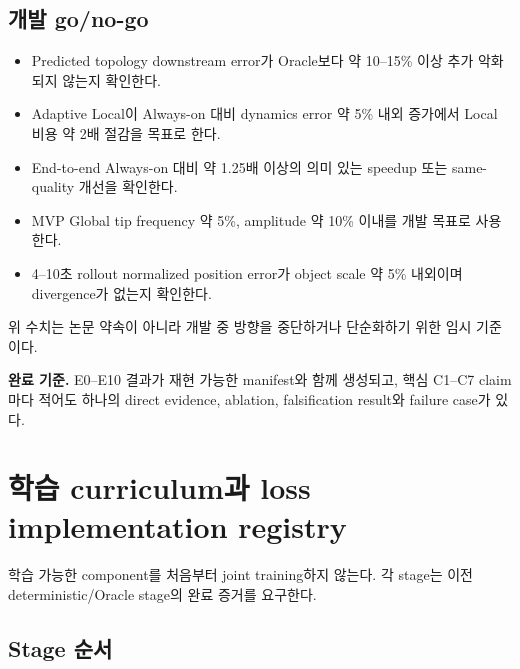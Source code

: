 \documentclass[10pt,a4paper]{article}
\newcommand{\todo}{\textcolor{TodoGray}{\(\square\)}}
\begin{document}
\subsection*{개발 go/no-go}

\begin{itemize}
  \item[\todo] Predicted topology downstream error가 Oracle보다 약 10--15\% 이상 추가 악화되지 않는지 확인한다.
  \item[\todo] Adaptive Local이 Always-on 대비 dynamics error 약 5\% 내외 증가에서 Local 비용 약 2배 절감을 목표로 한다.
  \item[\todo] End-to-end Always-on 대비 약 1.25배 이상의 의미 있는 speedup 또는 same-quality 개선을 확인한다.
  \item[\todo] MVP Global tip frequency 약 5\%, amplitude 약 10\% 이내를 개발 목표로 사용한다.
  \item[\todo] 4--10초 rollout normalized position error가 object scale 약 5\% 내외이며 divergence가 없는지 확인한다.
\end{itemize}

위 수치는 논문 약속이 아니라 개발 중 방향을 중단하거나 단순화하기 위한 임시 기준이다.

\textbf{완료 기준.}
E0--E10 결과가 재현 가능한 manifest와 함께 생성되고,
핵심 C1--C7 claim마다 적어도 하나의 direct evidence, ablation, falsification result와 failure case가 있다.

\section{학습 curriculum과 loss implementation registry}

학습 가능한 component를 처음부터 joint training하지 않는다.
각 stage는 이전 deterministic/Oracle stage의 완료 증거를 요구한다.

\subsection{Stage 순서}
\end{document}
